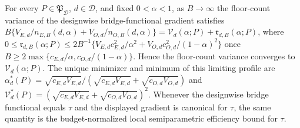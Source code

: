 For every \(P\in\mathfrak P_{\mathcal D}\), \(d\in\mathcal D\), and fixed \(0<\alpha<1\), as \(B\to\infty\) the floor-count variance of the designwise bridge-functional gradient satisfies \(B\{V_{E,d}/n_{E,B}(d,\alpha)+V_{O,d}/n_{O,B}(d,\alpha)\}=\mathcal V_d(\alpha;P)+\mathfrak r_{d,B}(\alpha;P)\), where \(0\le\mathfrak r_{d,B}(\alpha;P)\le 2B^{-1}\{V_{E,d}c_{E,d}^2/\alpha^2+V_{O,d}c_{O,d}^2/(1-\alpha)^2\}\) once \(B\ge2\max\{c_{E,d}/\alpha,c_{O,d}/(1-\alpha)\}\). Hence the floor-count variance converges to \(\mathcal V_d(\alpha;P)\). The unique minimizer and minimum of this limiting profile are \(\alpha_d^*(P)=\sqrt{c_{E,d}V_{E,d}}/(\sqrt{c_{E,d}V_{E,d}}+\sqrt{c_{O,d}V_{O,d}})\) and \(\mathcal V_d^*(P)=(\sqrt{c_{E,d}V_{E,d}}+\sqrt{c_{O,d}V_{O,d}})^2\).  Whenever the designwise bridge functional equals \(\tau\) and the displayed gradient is canonical for \(\tau\), the same quantity is the budget-normalized local semiparametric efficiency bound for \(\tau\).